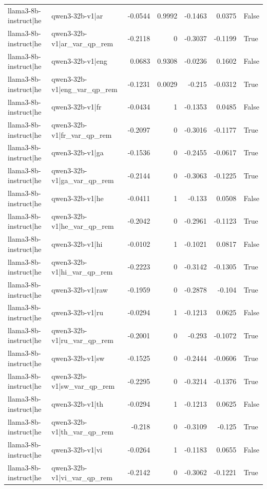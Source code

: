 \begin{table}
\begin{tabular}{l l r r r r l}
llama3-8b-instruct|he & qwen3-32b-v1|ar & -0.0544 & 0.9992 & -0.1463 & 0.0375 & False \\
llama3-8b-instruct|he & qwen3-32b-v1|ar_var_qp_rem & -0.2118 & 0 & -0.3037 & -0.1199 & True \\
llama3-8b-instruct|he & qwen3-32b-v1|eng & 0.0683 & 0.9308 & -0.0236 & 0.1602 & False \\
llama3-8b-instruct|he & qwen3-32b-v1|eng_var_qp_rem & -0.1231 & 0.0029 & -0.215 & -0.0312 & True \\
llama3-8b-instruct|he & qwen3-32b-v1|fr & -0.0434 & 1 & -0.1353 & 0.0485 & False \\
llama3-8b-instruct|he & qwen3-32b-v1|fr_var_qp_rem & -0.2097 & 0 & -0.3016 & -0.1177 & True \\
llama3-8b-instruct|he & qwen3-32b-v1|ga & -0.1536 & 0 & -0.2455 & -0.0617 & True \\
llama3-8b-instruct|he & qwen3-32b-v1|ga_var_qp_rem & -0.2144 & 0 & -0.3063 & -0.1225 & True \\
llama3-8b-instruct|he & qwen3-32b-v1|he & -0.0411 & 1 & -0.133 & 0.0508 & False \\
llama3-8b-instruct|he & qwen3-32b-v1|he_var_qp_rem & -0.2042 & 0 & -0.2961 & -0.1123 & True \\
llama3-8b-instruct|he & qwen3-32b-v1|hi & -0.0102 & 1 & -0.1021 & 0.0817 & False \\
llama3-8b-instruct|he & qwen3-32b-v1|hi_var_qp_rem & -0.2223 & 0 & -0.3142 & -0.1305 & True \\
llama3-8b-instruct|he & qwen3-32b-v1|raw & -0.1959 & 0 & -0.2878 & -0.104 & True \\
llama3-8b-instruct|he & qwen3-32b-v1|ru & -0.0294 & 1 & -0.1213 & 0.0625 & False \\
llama3-8b-instruct|he & qwen3-32b-v1|ru_var_qp_rem & -0.2001 & 0 & -0.293 & -0.1072 & True \\
llama3-8b-instruct|he & qwen3-32b-v1|sw & -0.1525 & 0 & -0.2444 & -0.0606 & True \\
llama3-8b-instruct|he & qwen3-32b-v1|sw_var_qp_rem & -0.2295 & 0 & -0.3214 & -0.1376 & True \\
llama3-8b-instruct|he & qwen3-32b-v1|th & -0.0294 & 1 & -0.1213 & 0.0625 & False \\
llama3-8b-instruct|he & qwen3-32b-v1|th_var_qp_rem & -0.218 & 0 & -0.3109 & -0.125 & True \\
llama3-8b-instruct|he & qwen3-32b-v1|vi & -0.0264 & 1 & -0.1183 & 0.0655 & False \\
llama3-8b-instruct|he & qwen3-32b-v1|vi_var_qp_rem & -0.2142 & 0 & -0.3062 & -0.1221 & True \\

\end{tabular}
\end{table}
